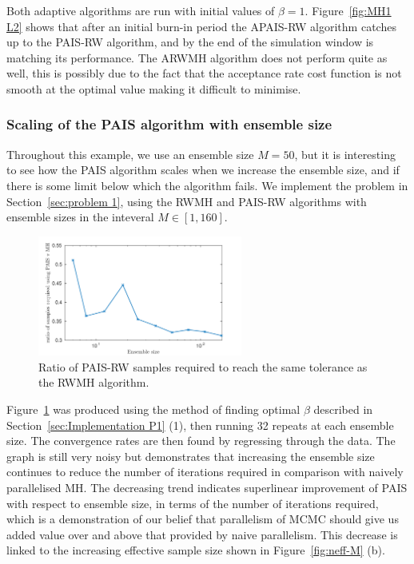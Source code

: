 \documentclass[final]{siamltex}
\begin{document}
Both adaptive algorithms are run with initial values of $\beta=1$. Figure~\ref{fig:MH1 L2} shows that after an initial burn-in period the APAIS-RW algorithm catches up to the PAIS-RW algorithm, and by the end of the simulation window is matching its performance. The ARWMH algorithm does not perform quite as well, this is possibly due to the fact that the acceptance rate cost function is not smooth at the optimal value making it difficult to minimise.

\subsubsection{Scaling of the PAIS algorithm with ensemble size}

Throughout this example, we use an ensemble size $M=50$, but it is interesting to see how the PAIS algorithm scales when we increase the ensemble size, and if there is some limit below which the algorithm fails. We implement the problem in Section~\ref{sec:problem 1}, using the RWMH and PAIS-RW algorithms with ensemble sizes in the inteveral $M \in [1, 160]$.

\begin{figure}[h]
\begin{center}
\includegraphics[width=0.6\textwidth]{"figures/PAIS_saving"}
\caption{Ratio of PAIS-RW samples required to reach the same tolerance as the RWMH algorithm.}
\label{fig:PAIS_saving}
\end{center}
\end{figure}

Figure~\ref{fig:PAIS_saving} was produced using the method of finding
optimal $\beta$ described in Section~\ref{sec:Implementation P1} (1),
then running 32 repeats at each ensemble size. The convergence rates
are then found by regressing through the data. The graph is still very
noisy but demonstrates that increasing the ensemble size continues to
reduce the number of iterations required in comparison with naively
parallelised MH. The decreasing trend indicates superlinear improvement of PAIS with
respect to ensemble size, in terms of the number of iterations
required, which is a demonstration of our belief that parallelism of
MCMC should give us added value over and above that provided by naive parallelism. This decrease is linked to the increasing effective sample size shown in Figure~\ref{fig:neff-M} (b).
\end{document}
